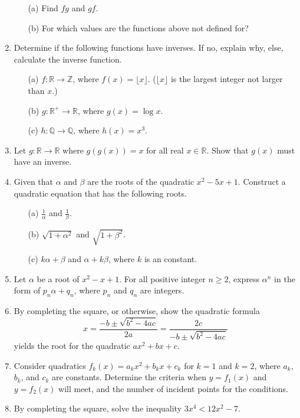 \documentclass{article}
\newcommand{\prestar}{\vspace*{0.3em}\hspace*{\fill}}
\newcommand{\onestar}{\marginpar{\prestar\textcolor{red}{$\ast$}}}
\begin{document}
\begin{enumerate}
      \begin{itemize}
              \item[(a)] Find $fg$ and $gf$.
              \item[(b)] For which values are the functions above not defined for?
       \end{itemize}
\item Determine if the following functions have inverses. If no, explain why, else, calculate the inverse function.
      \begin{itemize}
              \item[(a)] $f:\mathbb{R}\to\mathbb{Z}$, where $f(x)=\lfloor x\rfloor$. ($\lfloor x\rfloor$ is the largest integer not larger than $x$.)
              \item[(b)] $g:\mathbb{R}^+\to\mathbb{R}$, where $g(x)=\log x$.
              \item[(c)] $h:\mathbb{Q}\to\mathbb{Q}$, where $h(x)=x^3$.
       \end{itemize}
\item \onestar Let $g:\mathbb{R}\to\mathbb{R}$ where $g(g(x))=x$ for all real $x\in\mathbb{R}$. Show that $g(x)$ must have an inverse.
\item Given that $\alpha$ and $\beta$ are the roots of the quadratic $x^2-5x+1$. Construct a quadratic equation that has the following roots.
       \begin{itemize}
              \item[(a)] $\frac 1\alpha$ and $\frac 1\beta$.
              \item[(b)] $\sqrt{1+\alpha^2}$ and $\sqrt{1+\beta^2}$.
              \item[(c)] $k\alpha+\beta$ and $\alpha+k\beta$, where $k$ is an constant.
       \end{itemize}
\item Let $\alpha$ be a root of $x^2-x+1$. For all positive integer $n\ge 2$, express $\alpha^n$ in the form of $p_n\alpha+q_n$, where $p_n$ and $q_n$ are integers.
\item By completing the square, or otherwise, show the quadratic formula \[x=\frac{-b\pm \sqrt{b^2-4ac}}{2a}=\frac{2c}{-b\pm\sqrt{b^2-4ac}}\]yields the root for the quadratic $ax^2+bx+c$.
\item Consider quadratics $f_k(x)=a_kx^2+b_kx+c_k$ for $k=1$ and $k=2$, where $a_k$, $b_k$, and $c_k$ are constants. Determine the criteria when $y=f_1(x)$ and $y=f_2(x)$ will meet, and the number of incident points for the conditions.
\item By completing the square, solve the inequality $3x^4<12x^2-7$.

\end{enumerate}
\end{document}
